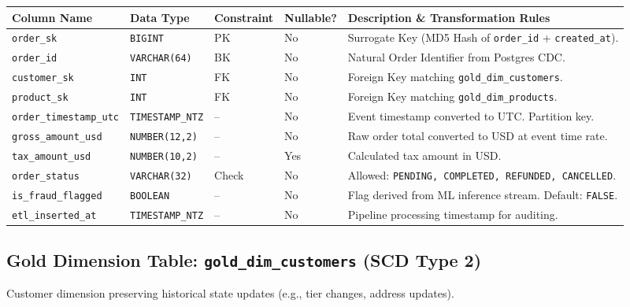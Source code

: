 \documentclass[10pt, a4paper]{article}
\begin{document}
\vspace{2pt}

\scriptsize
\begin{tabularx}{\textwidth}{@{}p{2.8cm}p{2.2cm}p{1.4cm}p{1.2cm}L@{}}
\toprule
{}
\textbf{Column Name} & \textbf{Data Type} & \textbf{Constraint} & \textbf{Nullable?} & \textbf{Description \& Transformation Rules} \\
\midrule
\texttt{order\_sk} & \texttt{BIGINT} & PK & No & Surrogate Key (MD5 Hash of \texttt{order\_id} + \texttt{created\_at}). \\
\texttt{order\_id} & \texttt{VARCHAR(64)} & BK & No & Natural Order Identifier from Postgres CDC. \\
\texttt{customer\_sk} & \texttt{INT} & FK & No & Foreign Key matching \texttt{gold\_dim\_customers}. \\
\texttt{product\_sk} & \texttt{INT} & FK & No & Foreign Key matching \texttt{gold\_dim\_products}. \\
\texttt{order\_timestamp\_utc} & \texttt{TIMESTAMP\_NTZ} & -- & No & Event timestamp converted to UTC. Partition key. \\
\texttt{gross\_amount\_usd} & \texttt{NUMBER(12,2)} & -- & No & Raw order total converted to USD at event time rate. \\
\texttt{tax\_amount\_usd} & \texttt{NUMBER(10,2)} & -- & Yes & Calculated tax amount in USD. \\
\texttt{order\_status} & \texttt{VARCHAR(32)} & Check & No & Allowed: \texttt{PENDING, COMPLETED, REFUNDED, CANCELLED}. \\
\texttt{is\_fraud\_flagged} & \texttt{BOOLEAN} & -- & No & Flag derived from ML inference stream. Default: \texttt{FALSE}. \\
\texttt{etl\_inserted\_at} & \texttt{TIMESTAMP\_NTZ} & -- & No & Pipeline processing timestamp for auditing. \\
\bottomrule
\end{tabularx}

\vspace{4pt}

\subsection{Gold Dimension Table: \texttt{gold\_dim\_customers} (SCD Type 2)}
Customer dimension preserving historical state updates (e.g., tier changes, address updates).

\vspace{2pt}
\end{document}
